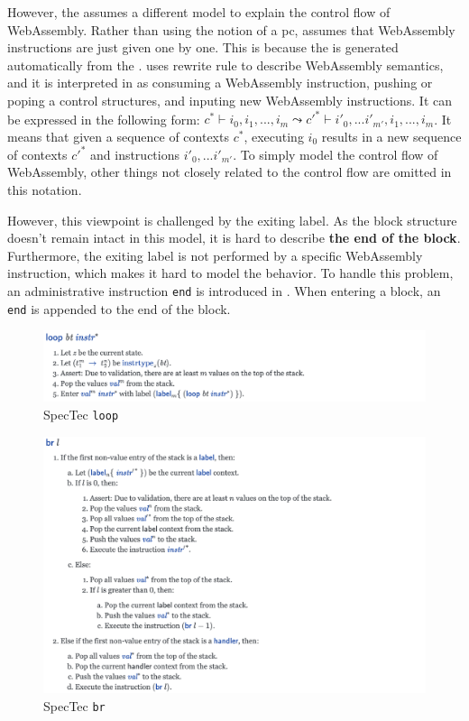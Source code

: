 However, the \spectecp{} assumes a different model to explain the control flow
of WebAssembly.
Rather than using the notion of a pc, \spectecp{} assumes that WebAssembly
instructions are just given one by one.
This is because the \spectecp{} is generated automatically from the
.
 uses rewrite rule to describe WebAssembly semantics, and it
is interpreted in \spectecp{} as consuming a WebAssembly instruction, pushing
or poping a control structures, and inputing new WebAssembly instructions.
It can be expressed in the following form:
$c^* \vdash i_0, i_1, ..., i_m \leadsto c'^* \vdash i'_0, ...i'_{m'}, i_1, ..., i_m$.
It means that given a sequence of contexts $c^*$, executing $i_0$ results in a
new sequence of contexts $c'^*$ and instructions $i'_0, ...i'_{m'}$.
To simply model the control flow of WebAssembly, other things not closely
related to the control flow are omitted in this notation.


However, this viewpoint is challenged by the exiting label.
As the block structure doesn't remain intact in this model, it is hard to
describe \textbf{the end of the block}.
Furthermore, the exiting label is not performed by a specific WebAssembly
instruction, which makes it hard to model the behavior.
To handle this problem, an administrative instruction \texttt{end} is
introduced in \spectecp.
When entering a block, an \texttt{end} is appended to the end of the block.


\begin{figure}[h!]
    \centerline{\includegraphics[width=15cm]{fig/spectec-loop}}
    \caption[Enter the caption title here]{SpecTec \texttt{loop}} \label{fig:spectec-loop}
\end{figure}
\begin{figure}[h!]
    \centerline{\includegraphics[width=15cm]{fig/spectec-br}}
    \caption[Enter the caption title here]{SpecTec \texttt{br}} \label{fig:spectec-br}
\end{figure}

